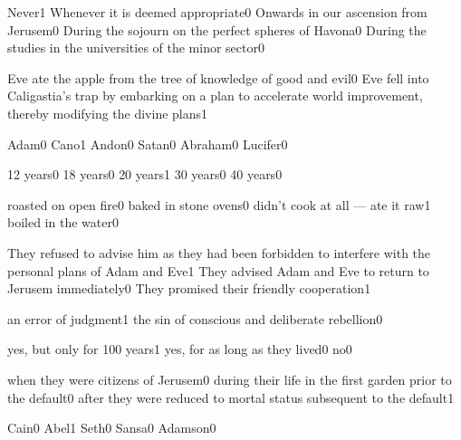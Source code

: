 {Never}{1}
{Whenever it is deemed appropriate}{0}
{Onwards in our ascension from Jerusem}{0}
{During the sojourn on the perfect spheres of Havona}{0}
{During the studies in the universities of the minor sector}{0}
\qstop

{Eve ate the apple from the tree of knowledge of good and evil}{0}
{Eve fell into Caligastia's trap by embarking on a plan to accelerate world improvement, thereby modifying the divine plans}{1}
\qstop

{Adam}{0}
{Cano}{1}
{Andon}{0}
{Satan}{0}
{Abraham}{0}
{Lucifer}{0}
\qstop

{12 years}{0}
{18 years}{0}
{20 years}{1}
{30 years}{0}
{40 years}{0}
\qstop

{roasted on open fire}{0}
{baked in stone ovens}{0}
{didn't cook at all --- ate it raw}{1}
{boiled in the water}{0}
\qstop

{They refused to advise him as they had been forbidden to interfere with the personal plans of Adam and Eve}{1}
{They advised Adam and Eve to return to Jerusem immediately}{0}
{They promised their friendly cooperation}{1}
\qstop


{an error of judgment}{1}
{the sin of conscious and deliberate rebellion}{0}
\qstop

{yes, but only for 100 years}{1}
{yes, for as long as they lived}{0}
{no}{0}
\qstop

{when they were citizens of Jerusem}{0}
{during their life in the first garden prior to the default}{0}
{after they were reduced to mortal status subsequent to the default}{1}
\qstop

{Cain}{0}
{Abel}{1}
{Seth}{0}
{Sansa}{0}
{Adamson}{0}
\qstop

